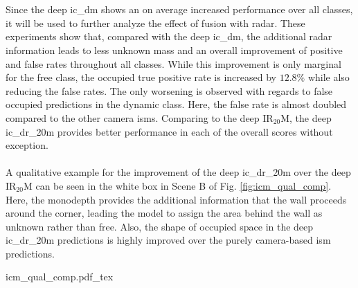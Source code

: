 \\\\ 
Since the deep \gls{ic_dm} shows an on average increased performance over all classes, it will be used to further analyze the effect of fusion with radar. These experiments show that, compared with the deep \gls{ic_dm}, the additional radar information leads to less unknown mass and an overall improvement of positive and false rates throughout all classes. While this improvement is only marginal for the free class, the occupied true positive rate is increased by $12.8\%$ while also reducing the false rates. The only worsening is observed with regards to false occupied predictions in the dynamic class. Here, the false rate is almost doubled compared to the other camera \gls{ism}s. Comparing to the deep IR$_{20}$M, the deep \gls{ic_dr_20m} provides better performance in each of the overall scores without exception.
\\\\
A qualitative example for the improvement of the deep \gls{ic_dr_20m} over the deep IR$_{20}$M can be seen in the white box in Scene B of Fig. \ref{fig:icm_qual_comp}. Here, the \gls{monodepth} provides the additional information that the wall proceeds around the corner, leading the model to assign the area behind the wall as unknown rather than free. Also, the shape of occupied space in the deep \gls{ic_dr_20m} predictions is highly improved over the purely camera-based \gls{ism} predictions.
\begin{center}
	{icm_qual_comp.pdf_tex}
\end{center}
%
